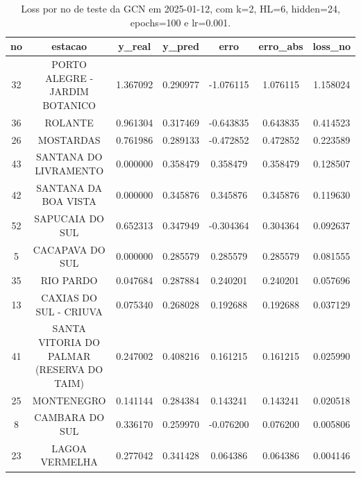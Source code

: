 \begin{table}[h]
\centering
\caption{Loss por no de teste da GCN em 2025-01-12, com k=2, HL=6, hidden=24, epochs=100 e lr=0.001.}
\label{tab:gcn_loss_k2_hl6_h24_e100_d20250112}
\begin{tabular}{ccccccc}
\toprule
no & estacao & y\_real & y\_pred & erro & erro\_abs & loss\_no \\
\midrule
32 & PORTO ALEGRE - JARDIM BOTANICO & 1.367092 & 0.290977 & -1.076115 & 1.076115 & 1.158024 \\
36 & ROLANTE & 0.961304 & 0.317469 & -0.643835 & 0.643835 & 0.414523 \\
26 & MOSTARDAS & 0.761986 & 0.289133 & -0.472852 & 0.472852 & 0.223589 \\
43 & SANTANA DO LIVRAMENTO & 0.000000 & 0.358479 & 0.358479 & 0.358479 & 0.128507 \\
42 & SANTANA DA BOA VISTA & 0.000000 & 0.345876 & 0.345876 & 0.345876 & 0.119630 \\
52 & SAPUCAIA DO SUL & 0.652313 & 0.347949 & -0.304364 & 0.304364 & 0.092637 \\
5 & CACAPAVA DO SUL & 0.000000 & 0.285579 & 0.285579 & 0.285579 & 0.081555 \\
35 & RIO PARDO & 0.047684 & 0.287884 & 0.240201 & 0.240201 & 0.057696 \\
13 & CAXIAS DO SUL - CRIUVA & 0.075340 & 0.268028 & 0.192688 & 0.192688 & 0.037129 \\
41 & SANTA VITORIA DO PALMAR (RESERVA DO TAIM) & 0.247002 & 0.408216 & 0.161215 & 0.161215 & 0.025990 \\
25 & MONTENEGRO & 0.141144 & 0.284384 & 0.143241 & 0.143241 & 0.020518 \\
8 & CAMBARA DO SUL & 0.336170 & 0.259970 & -0.076200 & 0.076200 & 0.005806 \\
23 & LAGOA VERMELHA & 0.277042 & 0.341428 & 0.064386 & 0.064386 & 0.004146 \\
\bottomrule
\end{tabular}
\end{table}
